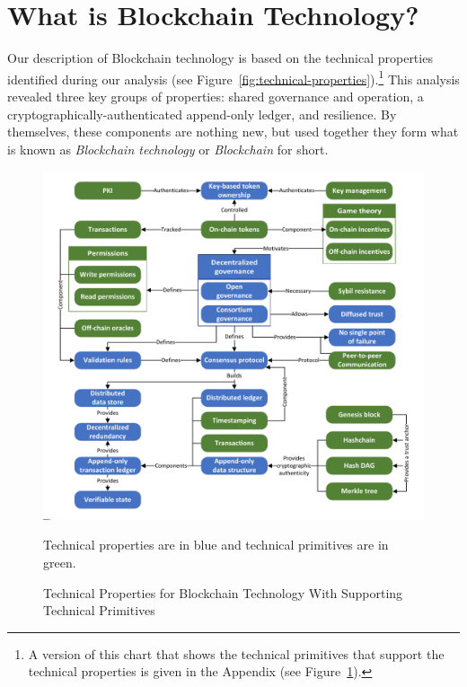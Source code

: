 
\section{What is Blockchain Technology?}
\label{sec:blockchain}
Our description of Blockchain technology is based on the technical properties identified during our analysis (see Figure~\ref{fig:technical-properties}).\footnote{A version of this chart that shows the technical primitives that support the technical properties is given in the Appendix (see Figure~\ref{fig:technical-properties-full}).}
This analysis revealed three key groups of properties: shared governance and operation, a cryptographically-authenticated append-only ledger, and resilience.
By themselves, these components are nothing new, but used together they form what is known as \emph{Blockchain technology} or \emph{Blockchain} for short.

\begin{figure}
	\centering
	\includegraphics[page=1,width=.75\textwidth]{figures/grounded-theory-main}
	
	Technical properties are in blue and technical primitives are in green.
	\caption{Technical Properties for Blockchain Technology With Supporting Technical Primitives}
	\label{fig:technical-properties-full}
\end{figure}

